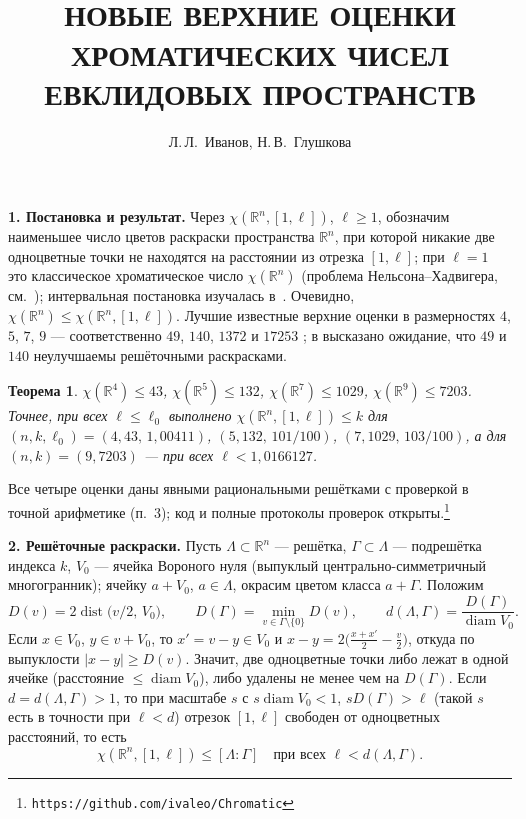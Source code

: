 \documentclass{article}
\newcommand{\R}{\mathbb{R}}
\newcommand{\diam}{\operatorname{diam}}
\newcommand{\dist}{\operatorname{dist}}
\newtheorem{theorem}{Теорема}
\begin{document}
\title{\\[8pt]
\bf\large\MakeUppercase{%
Новые верхние оценки хроматических чисел евклидовых пространств
}}

\author{Л.\,Л.~Иванов, Н.\,В.~Глушкова}
\date{}

\maketitle

\makeatletter
\renewcommand{\@makefnmark}{}
\makeatother

\textbf{1. Постановка и результат.}
Через $\chi(\R^n,[1,\ell])$, $\ell\ge1$, обозначим наименьшее число цветов
раскраски пространства $\R^n$, при которой никакие две одноцветные точки не
находятся на расстоянии из отрезка $[1,\ell]$; при $\ell=1$ это классическое
хроматическое число $\chi(\R^n)$ (проблема Нельсона--Хадвигера, см.~\cite{Soifer});
интервальная постановка изучалась в~\cite{Ivanov2011}. Очевидно,
$\chi(\R^n)\le\chi(\R^n,[1,\ell])$. Лучшие известные верхние оценки в
размерностях $4$, $5$, $7$, $9$ --- соответственно $49$, $140$, $1372$ и
$17253$ \cite{ABPR}; в \cite{ABPR} высказано ожидание, что $49$ и $140$
неулучшаемы решёточными раскрасками.

\begin{theorem}
$\chi(\R^4)\le43$, $\chi(\R^5)\le132$, $\chi(\R^7)\le1029$,
$\chi(\R^9)\le7203$. Точнее, при всех $\ell\le\ell_0$ выполнено
$\chi(\R^n,[1,\ell])\le k$ для $(n,k,\ell_0)=(4,43,\,1{,}00411)$,
$(5,132,\,101/100)$, $(7,1029,\,103/100)$, а для $(n,k)=(9,7203)$ --- при всех
$\ell<1{,}0166127$.
\end{theorem}

Все четыре оценки даны явными рациональными решётками с проверкой в точной
арифметике (п.~3); код и полные протоколы проверок открыты.\footnote{\texttt{https://github.com/ivaleo/Chromatic}}

\textbf{2. Решёточные раскраски.}
Пусть $\Lambda\subset\R^n$ --- решётка, $\Gamma\subset\Lambda$ --- подрешётка
индекса $k$, $V_0$ --- ячейка Вороного нуля (выпуклый центрально-симметричный
многогранник); ячейку $a+V_0$, $a\in\Lambda$, окрасим цветом класса $a+\Gamma$.
Положим
\[
D(v)=2\dist\bigl(v/2,\,V_0\bigr),\qquad
D(\Gamma)=\min_{v\in\Gamma\setminus\{0\}}D(v),\qquad
d(\Lambda,\Gamma)=\frac{D(\Gamma)}{\diam V_0}.
\]
Если $x\in V_0$, $y\in v+V_0$, то $x'=v-y\in V_0$ и
$x-y=2\bigl(\tfrac{x+x'}2-\tfrac v2\bigr)$, откуда по выпуклости
$|x-y|\ge D(v)$. Значит,
две одноцветные точки либо лежат в одной ячейке (расстояние $\le\diam V_0$),
либо удалены не менее чем на $D(\Gamma)$. Если $d=d(\Lambda,\Gamma)>1$, то при
масштабе $s$ с $s\diam V_0<1$, $sD(\Gamma)>\ell$ (такой $s$ есть в точности при
$\ell<d$) отрезок $[1,\ell]$ свободен от одноцветных расстояний, то есть
\begin{equation}\label{crit}
\chi(\R^n,[1,\ell])\le[\Lambda:\Gamma]\quad\text{при всех }\ell<d(\Lambda,\Gamma).
\end{equation}
\end{document}
